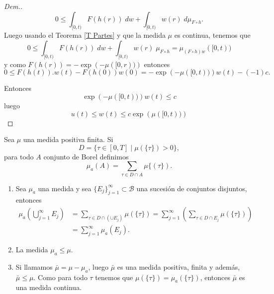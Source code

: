 \begin{proof}[Dem.]
\begin{equation*}
	0\leq\int_{[0,t)}F(h(r))\; dw+  \int_{[0,t)}w(r)\; d\mu_{F\circ h}.
\end{equation*}
 Luego usando el Teorema \ref{T Partes} y que la medida $\mu$ es continua, tenemos que 
\begin{equation*}
	0\leq\int_{[0,t)}F(h(r))\; dw+  \int_{[0,t)}w(r)\; \mu_{F\circ h}=\mu_{(F\circ h)w}([0,t))    
 \end{equation*}
 y como $F(h(r))=-\exp{\left(-\mu([0,r))\right)}$ entonces
 \begin{equation*}
	0\leq F(h(t)).w(t)-F(h(0))w(0)=-\exp\left( -\mu([0,t))\right)w(t) -(-1)c.
\end{equation*}


Entonces
	$$\exp\left( -\mu([0,t))\right)w(t) \leq c$$
luego 
 $$u(t)\leq w(t)\leq c\exp\left( \mu([0,t))\right) $$
\end{proof}

\begin{defi}\label{mu_a}
	Sea $\mu$ una medida positiva finita.  
Si $$D=\{\tau\in[0,T] \mid \mu(\{\tau\})> 0\},$$ para todo $A$ conjunto de Borel definimos
$$\mu_a(A)=\sum_{\tau\in D\cap A}\mu\{(\tau\}).$$
\end{defi}




\begin{obs} \vphantom{a}
\begin{enumerate}
\item Sea  $\mu_a$ una medida y sea $\{E_j\}_{j=1}^\infty\subset \mathscr{B}$ una sucesión de conjuntos disjuntos, entonces
\begin{equation*}
\begin{split}
	\mu_a \left( \bigcup_{j=1}^{\infty}E_j\right)& = \sum_{\tau\in D\cap \left( \cup E_j\right)}\mu(\{\tau\})
   =\sum_{j=1}^{\infty}\left( \sum_{\tau\in D\cap E_j}\mu(\{\tau\}) \right) \\ &=\sum_{j=1}^{\infty}\mu_a(E_j).
\end{split}
\end{equation*}
	

\item La medida $\mu_a\leq\mu$.

\item  Si llamamos $\bar{\mu}=\mu-\mu_a$\index[Simbolo]{$\bar{\mu}$}, luego $\bar{\mu}$ es una medida positiva,  finita y además, $\bar{\mu}\leq \mu$. Como para todo $\tau$ tenemos que $\mu(\{\tau\})=\mu_a(\{\tau\})$, entonces $\bar{\mu}$ es una medida continua.
\end{enumerate}
\end{obs}

